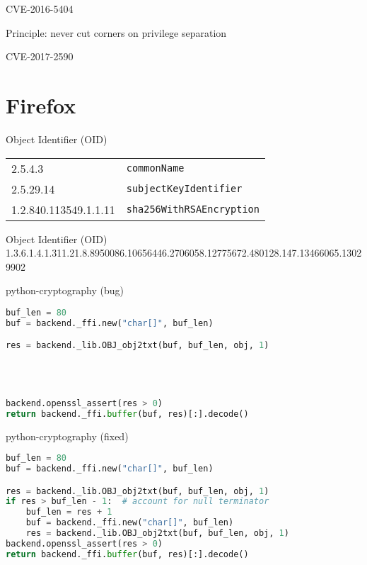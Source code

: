 \documentclass[ignorenonframetext,aspectratio=169,dvipsnames]{beamer}
\begin{document}
\begin{frame}[plain]
\huge
CVE-2016-5404
\end{frame}

\begin{frame}[plain]
\huge
Principle: never cut corners on privilege separation
\end{frame}


\begin{frame}[plain]
\huge
CVE-2017-2590
\end{frame}







\section{Firefox}\label{firefox}


\begin{frame}{Object Identifier (OID)}
\Large
  \begin{tabular}{l l}
    2.5.4.3 & {\tt commonName} \\
    2.5.29.14 & {\tt subjectKeyIdentifier} \\
    1.2.840.113549.1.1.11 & {\tt sha256WithRSAEncryption} \\
  \end{tabular}
\end{frame}

\begin{frame}{Object Identifier (OID)}
  1.3.6.1.4.1.311.21.8.8950086.10656446.2706058.12775672.480128.147.13466065.13029902
\end{frame}

\begin{frame}[fragile]{python-cryptography (bug)}
\begin{lstlisting}[language=Python]
buf_len = 80
buf = backend._ffi.new("char[]", buf_len)

res = backend._lib.OBJ_obj2txt(buf, buf_len, obj, 1)




backend.openssl_assert(res > 0)
return backend._ffi.buffer(buf, res)[:].decode()
\end{lstlisting}
\end{frame}

\begin{frame}[fragile]{python-cryptography (fixed)}
\begin{lstlisting}[language=Python]
buf_len = 80
buf = backend._ffi.new("char[]", buf_len)

res = backend._lib.OBJ_obj2txt(buf, buf_len, obj, 1)
if res > buf_len - 1:  # account for null terminator
    buf_len = res + 1
    buf = backend._ffi.new("char[]", buf_len)
    res = backend._lib.OBJ_obj2txt(buf, buf_len, obj, 1)
backend.openssl_assert(res > 0)
return backend._ffi.buffer(buf, res)[:].decode()
\end{lstlisting}
\end{frame}
\end{document}
